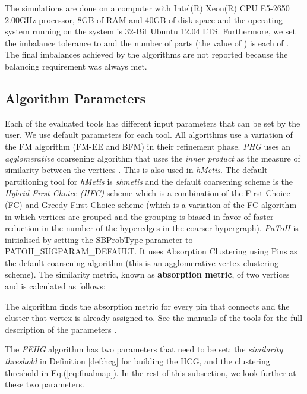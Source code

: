 \documentclass[twocolumn]{svjour3}          \smartqed
\begin{document}
The simulations are done on a computer with Intel(R) Xeon(R) CPU E5-2650 2.00GHz processor, 8GB of RAM and 40GB of disk space and the operating system running on the system is 32-Bit Ubuntu 12.04 LTS. Furthermore, we set the imbalance tolerance to  and the number of parts (the value of ) is each of . The final imbalances achieved by the algorithms are not reported because the balancing requirement was always met.

\subsection{Algorithm Parameters}\label{sec:fehg_parameters}

Each of the evaluated tools has different input parameters that can be set by the user. We use default parameters for each tool. All algorithms use a variation of the FM algorithm (FM-EE and BFM) in their refinement phase. \textit{PHG} uses an \textit{agglomerative} coarsening algorithm that uses the \textit{inner product} as the measure of similarity between the vertices \cite{devetal2006}. This is also used in \textit{hMetis}. The default partitioning tool for \textit{hMetis} is \textit{shmetis} and the default coarsening scheme is the \textit{Hybrid First Choice (HFC)} scheme which is a combination of the First Choice (FC) \cite{karytech2002} and Greedy First Choice scheme (which is a variation of the FC algorithm in which vertices are grouped and the grouping is biased in favor of faster reduction in the number of the hyperedges in the coarser hypergraph). \textit{PaToH} is initialised by setting the \textsf{SBProbType} parameter to \textsf{PATOH\_SUGPARAM\_DEFAULT}. It uses Absorption Clustering using Pins as the default coarsening algorithm (this is an agglomerative vertex clustering scheme). The similarity metric, known as \textbf{absorption metric}, of two vertices  and  is calculated as follows:


The algorithm finds the absorption metric for every pin that connects  and the cluster that vertex  is already assigned to. See the manuals of the tools for the full description of the parameters \cite{ccatalyurek2011patoh,karypis1998hmetis,zoltanurl}.

The \textit{FEHG} algorithm has two parameters that need to be set: the \textit{similarity threshold} in Definition \ref{def:hcg} for building the HCG, and the clustering threshold in Eq.(\ref{eq:finalmap}). In the rest of this subsection, we look further at these two parameters. 
\end{document}
